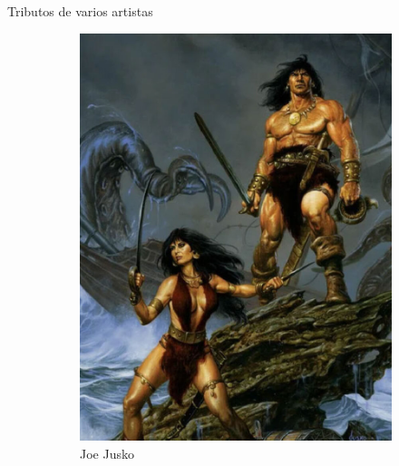 \begin{frame}{Tributos de varios artistas}
\begin{figure}[htp]
\begin{subfigure}[b]{0.22\textwidth}
			\includegraphics[width=\textwidth]{img/tributos/JoeJusko}
			\caption{Joe Jusko}
		\end{subfigure}
		~
		\begin{subfigure}[b]{0.22\textwidth}

\end{subfigure}
\end{figure}
\end{frame}
